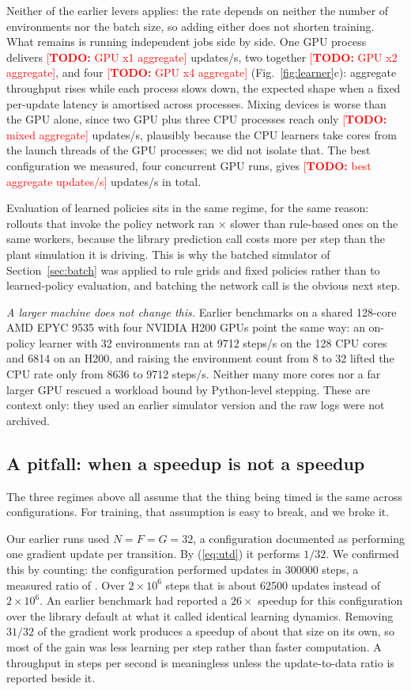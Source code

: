 \documentclass[conference]{IEEEtran}
\newcommand{\TODO}[1]{\textcolor{red}{[\textbf{TODO:} #1]}}
\providecommand{\NumMultiGpuOne}{\TODO{GPU x1 aggregate}}
\providecommand{\NumMultiGpuTwo}{\TODO{GPU x2 aggregate}}
\providecommand{\NumMultiGpuFour}{\TODO{GPU x4 aggregate}}
\providecommand{\NumMultiMixed}{\TODO{mixed aggregate}}
\providecommand{\NumMultiBest}{\TODO{best aggregate updates/s}}
\begin{document}
Neither of the earlier levers applies: the rate depends on neither the number of environments nor the batch size,
so adding either does not shorten training. What remains is running independent jobs side by side. One GPU process
delivers \NumMultiGpuOne{} updates/s, two together \NumMultiGpuTwo{}, and four \NumMultiGpuFour{}
(Fig.~\ref{fig:learner}c): aggregate throughput rises while each process slows down, the expected shape when a
fixed per-update latency is amortised across processes. Mixing devices is worse than the GPU alone, since two GPU
plus three CPU processes reach only \NumMultiMixed{} updates/s, plausibly because the CPU learners take cores from
the launch threads of the GPU processes; we did not isolate that. The best configuration we measured, four
concurrent GPU runs, gives \NumMultiBest{} updates/s in total.

Evaluation of learned policies sits in the same regime, for the same reason: rollouts that invoke the policy
network ran \NumEvalRatio$\times$ slower than rule-based ones on the same workers, because the library prediction
call costs more per step than the plant simulation it is driving. This is why the batched simulator of
Section~\ref{sec:batch} was applied to rule grids and fixed policies rather than to learned-policy evaluation, and
batching the network call is the obvious next step.

\emph{A larger machine does not change this.} Earlier benchmarks on a shared 128-core AMD EPYC 9535 with four
NVIDIA H200 GPUs point the same way: an on-policy learner with 32 environments ran at \num{9712} steps/s on the
128 CPU cores and \num{6814} on an H200, and raising the environment count from 8 to 32 lifted the CPU rate only
from \num{8636} to \num{9712} steps/s. Neither many more cores nor a far larger GPU rescued a workload bound by
Python-level stepping. These are context only: they used an earlier simulator version and the raw logs were not
archived.

\subsection{A pitfall: when a speedup is not a speedup}\label{sec:utdres}
The three regimes above all assume that the thing being timed is the same across configurations. For training, that
assumption is easy to break, and we broke it.

Our earlier runs used $N=F=G=32$, a configuration documented as performing one gradient update per transition. By
(\ref{eq:utd}) it performs $1/32$. We confirmed this by counting: the configuration performed \NumEThreeUpdLow{}
updates in \num{300000} steps, a measured ratio of \NumUtdMeasuredLow{}. Over $2\times10^6$ steps that is about
\num{62500} updates instead of $2\times10^6$. An earlier benchmark had reported a $26\times$ speedup for this
configuration over the library default at what it called identical learning dynamics. Removing $31/32$ of the
gradient work produces a speedup of about that size on its own, so most of the gain was less learning per step
rather than faster computation. A throughput in steps per second is meaningless unless the update-to-data ratio is
reported beside it.
\end{document}
